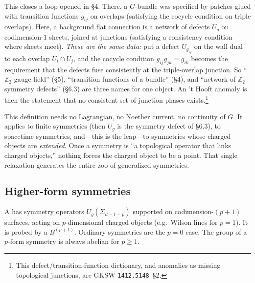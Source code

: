 \documentclass[11pt]{article}
\newcommand{\Ztwo}{\mathbb{Z}_2}
\begin{document}
\begin{reemark}
This closes a loop opened in \S4. There, a $G$-bundle was specified by patches glued
with transition functions $g_{ij}$ on overlaps (satisfying the cocycle condition on
triple overlaps). Here, a background flat connection is a network of defects $U_g$ on
codimension-$1$ sheets, joined at junctions (satisfying a consistency condition where
sheets meet). \emph{These are the same data:} put a defect $U_{g_{ij}}$ on the wall dual
to each overlap $U_i\cap U_j$, and the cocycle condition $g_{ij}g_{jk}=g_{ik}$ becomes
the requirement that the defects fuse consistently at the triple-overlap junction. So
``$\Ztwo$ gauge field'' (\S5), ``transition functions of a bundle'' (\S4), and ``network
of $\Ztwo$ symmetry defects'' (\S6.3) are three names for one object. An 't Hooft anomaly
is then the statement that no consistent set of junction phases exists.\footnote{This
defect/transition-function dictionary, and anomalies as missing topological junctions,
are GKSW \texttt{1412.5148}~\S2.}
\end{reemark}

\begin{iintuition}
This definition needs no Lagrangian, no Noether current, no continuity of $G$. It
applies to finite symmetries (then $U_g$ is the symmetry defect of \S6.3), to spacetime
symmetries, and---this is the leap---to symmetries whose charged objects are
\emph{extended}. Once a symmetry is ``a topological operator that links charged
objects,'' nothing forces the charged object to be a point. That single relaxation
generates the entire zoo of generalized symmetries.
\end{iintuition}

\subsection{Higher-form symmetries}

\begin{ddefinition}
A  has symmetry operators $U_g(\Sigma_{d-1-p})$
supported on codimension-$(p{+}1)$ surfaces, acting on $p$-dimensional charged objects
(e.g.\ Wilson lines for $p=1$). It is probed by a  $B^{(p+1)}$. Ordinary symmetries are the $p=0$ case. The group of a $p$-form
symmetry is always abelian for $p\geq1$.
\end{ddefinition}
\end{document}
